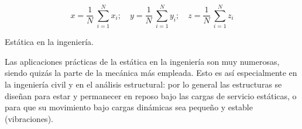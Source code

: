 $$ x= \dfrac 1 N \ \sum_{i=1}^N x_i; \quad y= \dfrac 1 N \ \sum_{i=1}^N y_i; \quad z= \dfrac 1 N \ \sum_{i=1}^N z_i$$




\newpage %

\begin{myblock}{Estática en la ingeniería.}

Las aplicaciones prácticas de la estática en la ingeniería son muy numerosas, siendo quizás la parte de la mecánica más empleada. Esto es así especialmente en la ingeniería civil y en el análisis estructural: por lo general las estructuras se diseñan para estar y permanecer en reposo bajo las cargas de servicio estáticas, o para que su movimiento bajo cargas dinámicas sea pequeño y estable (vibraciones).
	
\end{myblock}



